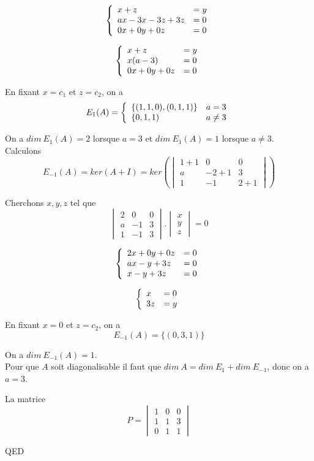 \documentclass[]{book}
\theoremstyle{definition}
\begin{document}
$$
\left\{ 
\begin{array}{l l}
x  + z & = y\\
ax - 3x -3z + 3z & = 0\\
0x + 0y + 0z & = 0\\
\end{array}
\right. 
$$ 

$$
\left\{ 
\begin{array}{l l}
x  + z & = y\\
x(a - 3) & = 0\\
0x + 0y + 0z & = 0\\
\end{array}
\right. 
$$ 

En fixant $x=c_1$ et $z=c_2$, on a
$$
E_{1}(A)=
\left\{ 
\begin{array}{l l}
\{(1,1,0),(0,1,1)\} & a = 3\\
\{0,1,1) & a \neq 3\\
\end{array}
\right. 
$$ 

On a $dim\ E_{1}(A)= 2$ lorsque $a=3$ et $dim\ E_{1}(A)= 1$ lorsque $a \neq 3$.\\


Calculons 
$$E_{-1}(A)=ker(A+I) = ker\left( \begin{vmatrix} 1 + 1 & 0 & 0 \\ a & -2 + 1 & 3 \\  1 & -1 & 2 + 1 \end{vmatrix} \right)$$

Cherchons $x,y,z$ tel que
$$\begin{vmatrix} 2 & 0 & 0 \\ a & -1 & 3 \\  1 & -1 & 3 \end{vmatrix} . \begin{vmatrix} x \\ y \\  z \end{vmatrix} = 0$$

$$
\left\{ 
\begin{array}{l l}
2x + 0y + 0z & = 0\\
ax - y + 3z & = 0\\
x - y + 3z & = 0\\
\end{array}
\right. 
$$ 

$$
\left\{ 
\begin{array}{l l}
x  & = 0\\
3z & = y\\
\end{array}
\right. 
$$ 

En fixant $x=0$ et $z=c_2$, on a
$$
E_{-1}(A)=\{(0,3,1)\}
$$ 

On a $dim\ E_{-1}(A)= 1$.\\

Pour que $A$ soit diagonalisable il faut que $dim\ A = dim\ E_{1} + dim\ E_{-1}$, donc on a $a = 3$.

La matrice
$$P = \begin{vmatrix} 1 & 0 & 0 \\ 1 & 1 & 3 \\  0 & 1 & 1 \end{vmatrix} $$

QED
\end{document}
